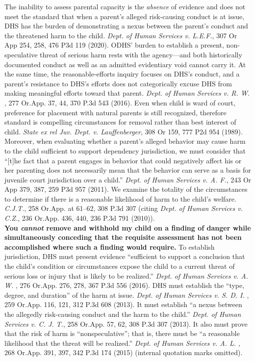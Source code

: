 \documentclass[10pt,a4paper,roman]{moderncv}
\begin{document}
\begin{enumerate}[leftmargin=*,itemsep=0.35em,topsep=0.3em,resume]
The inability to assess parental capacity is the \emph{absence} of evidence and does not meet the standard that when a parent's alleged risk-causing conduct is at issue, DHS has the burden of demonstrating a nexus between the parent's conduct and the threatened harm to the child. \textit{Dept. of Human Services v. L.E.F.}, 307 Or App 254, 258, 476 P3d 119 (2020). ODHS' burden to establish a present, non-speculative threat of serious harm rests with the agency---and both historically documented conduct as well as an admitted evidentiary void cannot carry it. At the same time, the reasonable-efforts inquiry focuses on DHS's conduct, and a parent's resistance to DHS's efforts does not categorically excuse DHS from making meaningful efforts toward that parent. \textit{Dept. of Human Services v. R. W.} , 277 Or.App. 37, 44, 370 P.3d 543 (2016). Even when child is ward of court, preference for placement with natural parents is still recognized, therefore standard is compelling circumstances for removal rather than best interest of child. \textit{State ex rel Juv. Dept. v. Lauffenberger}, 308 Or 159, 777 P2d 954 (1989).\\

Moreover, when evaluating whether a parent's alleged behavior may cause harm to the child sufficient to support dependency jurisdiction, we must consider that ``[t]he fact that a parent engages in behavior that could negatively affect his or her parenting does not necessarily mean that the behavior can serve as a basis for juvenile court jurisdiction over a child.'' \textit{Dept. of Human Services v. A. F.}, 243 Or App 379, 387, 259 P3d 957 (2011). We examine the totality of the circumstances to determine if there is a reasonable likelihood of harm to the child's welfare. \textit{C.J.T.}, 258 Or.App. at 61--62, 308 P.3d 307 (citing \textit{Dept. of Human Services v. C.Z.}, 236 Or.App. 436, 440, 236 P.3d 791 (2010)).\\

\textbf{You \textit{cannot} remove and withhold my child on a finding of danger while simultaneously conceding that the requisite assessment has not been accomplished where such a finding would require.} To establish jurisdiction, DHS must present evidence ``sufficient to support a conclusion that the child's condition or circumstances expose the child to a current threat of serious loss or injury that is likely to be realized.'' \textit{Dept. of Human Services v. A. W.} , 276 Or.App. 276, 278, 367 P.3d 556 (2016). DHS must establish the ``type, degree, and duration'' of the harm at issue. \textit{Dept. of Human Services v. S. D. I.} , 259 Or.App. 116, 121, 312 P.3d 608 (2013). It must establish ``a nexus between the allegedly risk-causing conduct and the harm to the child.'' \textit{Dept. of Human Services v. C. J. T.}, 258 Or.App. 57, 62, 308 P.3d 307 (2013). It also must prove that the risk of harm is ``nonspeculative''; that is, there must be ``a reasonable likelihood that the threat will be realized.'' \textit{Dept. of Human Services v. A. L.} , 268 Or.App. 391, 397, 342 P.3d 174 (2015) (internal quotation marks omitted).\\


\end{enumerate}
\end{document}
